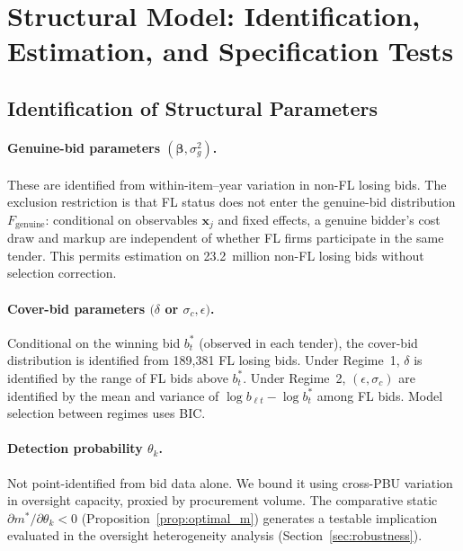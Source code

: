 
\section{Structural Model: Identification, Estimation, and Specification Tests}
\label{app:structural_id}

\subsection{Identification of Structural Parameters}

\paragraph{Genuine-bid parameters $(\boldsymbol{\beta}, \sigma_g^2)$.}
These are identified from within-item--year variation in non-FL
losing bids. The exclusion restriction is that FL status does not
enter the genuine-bid distribution $F_{\text{genuine}}$: conditional
on observables $\mathbf{x}_j$ and fixed effects, a genuine bidder's
cost draw and markup are independent of whether FL firms participate
in the same tender. This permits estimation on 23.2~million non-FL
losing bids without selection correction.

\paragraph{Cover-bid parameters $(\delta$ or $\sigma_c, \epsilon)$.}
Conditional on the winning bid $b^*_t$ (observed in each tender),
the cover-bid distribution is identified from 189,381 FL losing
bids. Under Regime~1, $\delta$ is identified by the range of FL
bids above $b^*_t$. Under Regime~2, $(\epsilon, \sigma_c)$ are
identified by the mean and variance of $\log b_{\ell t} - \log b^*_t$
among FL bids. Model selection between regimes uses BIC.

\paragraph{Detection probability $\theta_k$.}
Not point-identified from bid data alone.
We bound it using cross-PBU variation in oversight capacity, proxied
by procurement volume. The comparative static $\partial m^* /
\partial \theta_k < 0$ (Proposition~\ref{prop:optimal_m}) generates
a testable implication evaluated in the oversight heterogeneity
analysis (Section~\ref{sec:robustness}).

